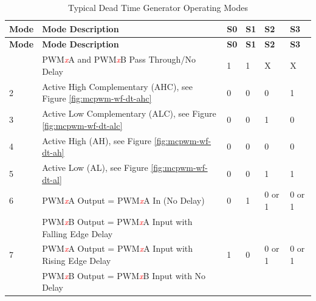 \begin{longtable}[c]{ |p{1cm}|p{10cm}|p{1cm}|p{1cm}|p{1cm}|p{1cm}|}
    \caption{Typical Dead Time Generator Operating Modes}
    \label{tab:mcpwm-mod-dt}
    \\\hline
    \rowcolor{lightgray}
    \textbf{Mode}
    & \textbf{Mode Description}
    & \textbf{S0}
    & \textbf{S1}
    & \textbf{S2}
    & \textbf{S3}
    \\\hline
    \endfirsthead
    \hline
    \rowcolor{lightgray}   
    \textbf{Mode}
    & \textbf{Mode Description}
    & \textbf{S0}
    & \textbf{S1}
    & \textbf{S2}
    & \textbf{S3}
    \\\hline
    \endhead
    \hline
    \endfoot
    1
    & PWM\textcolor{red}{\it{x}}A and PWM\textcolor{red}{\it{x}}B Pass Through/No Delay
    & 1
    & 1
    & X
    & X
    \\\hline
    2
    & Active High Complementary (AHC), see Figure \ref{fig:mcpwm-wf-dt-ahc}
    & 0
    & 0
    & 0
    & 1
    \\\hline
    3
    & Active Low Complementary (ALC), see Figure \ref{fig:mcpwm-wf-dt-alc}
    & 0
    & 0
    & 1
    & 0
    \\\hline
    4
    & Active High (AH), see Figure \ref{fig:mcpwm-wf-dt-ah}
    & 0
    & 0
    & 0
    & 0
    \\\hline
    5
    & Active Low (AL), see Figure \ref{fig:mcpwm-wf-dt-al}
    & 0
    & 0
    & 1
    & 1
    \\\hline
    6
    & PWM\textcolor{red}{\it{x}}A Output = PWM\textcolor{red}{\it{x}}A In (No Delay)
    & 0
    & 1
    & 0 or 1
    & 0 or 1 \\
    & PWM\textcolor{red}{\it{x}}B Output = PWM\textcolor{red}{\it{x}}A Input with Falling Edge Delay &&&&
    \\\hline
    7
    & PWM\textcolor{red}{\it{x}}A Output = PWM\textcolor{red}{\it{x}}A Input with Rising Edge Delay
    & 1
    & 0
    & 0 or 1
    & 0 or 1\\
    & PWM\textcolor{red}{\it{x}}B Output = PWM\textcolor{red}{\it{x}}B Input with No Delay &&&&
    \\\hline
\end{longtable}

